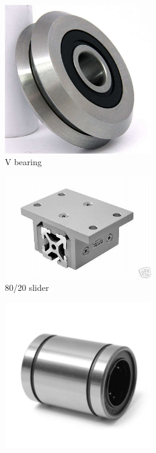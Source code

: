 	\begin{figure}[H]
		\begin{subfigure}[b]{.32\linewidth}
			\includegraphics[width=0.7\textwidth]{imgs/vbearing.jpeg}
			\caption{V bearing}
		\end{subfigure}
		\begin{subfigure}[b]{.32\linewidth}
			\includegraphics[width=0.7\textwidth]{imgs/8020slider.jpeg}
			\caption{80/20 slider}
		\end{subfigure}
		\begin{subfigure}[b]{.32\linewidth}
			\includegraphics[width=0.7\textwidth]{imgs/linearbearing.jpeg}

\end{subfigure}
\end{figure}
